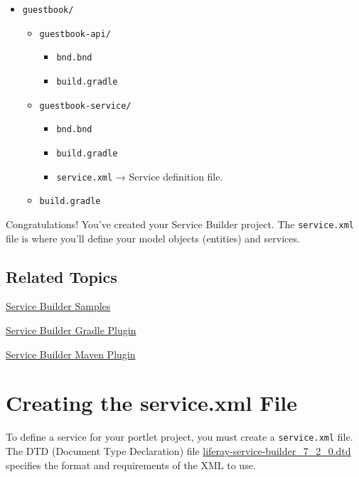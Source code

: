 \begin{itemize}
\tightlist
\item
  \texttt{guestbook/}

  \begin{itemize}
  \tightlist
  \item
    \texttt{guestbook-api/}

    \begin{itemize}
    \tightlist
    \item
      \texttt{bnd.bnd}
    \item
      \texttt{build.gradle}
    \end{itemize}
  \item
    \texttt{guestbook-service/}

    \begin{itemize}
    \tightlist
    \item
      \texttt{bnd.bnd}
    \item
      \texttt{build.gradle}
    \item
      \texttt{service.xml} → Service definition file.
    \end{itemize}
  \item
    \texttt{build.gradle}
  \end{itemize}
\end{itemize}

Congratulations! You've created your Service Builder project. The
\texttt{service.xml} file is where you'll define your model objects
(entities) and services.

\section{Related Topics}\label{related-topics-12}

\href{/docs/7-2/reference/-/knowledge_base/r/blade-cli}{Service Builder
Samples}

\href{/docs/7-2/reference/-/knowledge_base/r/service-builder-gradle-plugin}{Service
Builder Gradle Plugin}

\href{/docs/7-2/reference/-/knowledge_base/r/service-builder-plugin}{Service
Builder Maven Plugin}

\chapter{Creating the service.xml
File}\label{creating-the-service.xml-file}

To define a service for your portlet project, you must create a
\texttt{service.xml} file. The DTD (Document Type Declaration) file
\href{https://docs.liferay.com/ce/portal/7.2-latest/definitions/liferay-service-builder_7_2_0.dtd.html}{liferay-service-builder\_7\_2\_0.dtd}
specifies the format and requirements of the XML to use.

